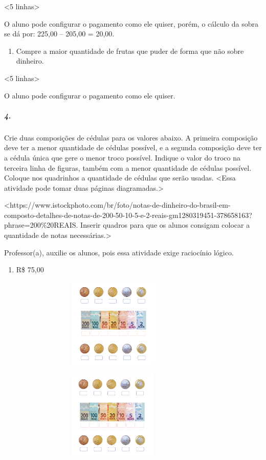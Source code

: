 \textless{}5 linhas\textgreater{}

O aluno pode configurar o pagamento como ele quiser, porém, o cálculo da
sobra se dá por: 225,00 -- 205,00 = 20,00.

\begin{enumerate}
\def\labelenumi{\alph{enumi})}
\item
  Compre a maior quantidade de frutas que puder de forma que não sobre
  dinheiro.
\end{enumerate}

\textless{}5 linhas\textgreater{}

O aluno pode configurar o pagamento como ele quiser.

\subparagraph{4.}\label{section-60}

Crie duas composições de cédulas para os valores abaixo. A primeira
composição deve ter a menor quantidade de cédulas possível, e a segunda
composição deve ter a cédula única que gere o menor troco possível.
Indique o valor do troco na terceira linha de figuras, também com a
menor quantidade de cédulas possível. Coloque nos quadrinhos a
quantidade de cédulas que serão usadas. \textless{}Essa atividade pode
tomar duas páginas diagramadas.\textgreater{}

\textless{}https://www.istockphoto.com/br/foto/notas-de-dinheiro-do-brasil-em-composto-detalhes-de-notas-de-200-50-10-5-e-2-reais-gm1280319451-378658163?phrase=200\%20REAIS.
Inserir quadros para que os alunos consigam colocar a quantidade de
notas necessárias.\textgreater{}

Professor(a), auxilie os alunos, pois essa atividade exige raciocínio
lógico.

\begin{enumerate}
\def\labelenumi{\alph{enumi})}
\item
  R\$ 75,00
\end{enumerate}

\includegraphics[width=4.45833in,height=1.68116in]{media/image72.png}

\includegraphics[width=4.40625in,height=1.66152in]{media/image72.png}

